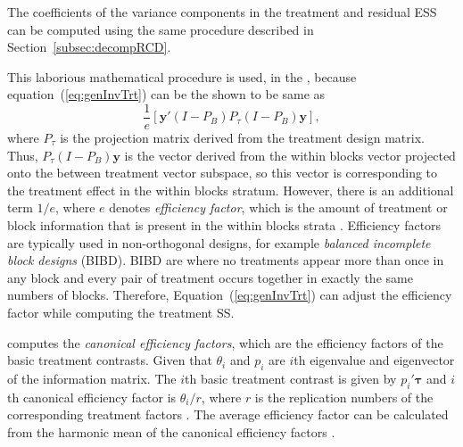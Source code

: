 \documentclass[article]{jss}
\begin{document}
The coefficients of the variance components in the treatment and residual ESS can be computed using the same procedure described in Section~\ref{subsec:decompRCD}.

This laborious mathematical procedure is used, in the , because equation~(\ref{eq:genInvTrt}) can be the shown to be same as 
\begin{equation}\label{eq:projTrtBlock}
\frac{1}{e}[ \bm{y}'(I - P_B)P_{\tau}(I - P_B)\bm{y}],
\end{equation}
where $P_{\tau}$ is the projection matrix derived from the treatment design matrix. Thus, $P_{\tau}(I - P_B)\bm{y}$ is the vector derived from the within blocks vector projected onto the between treatment vector subspace, so this vector is corresponding to the treatment effect in the within blocks stratum. However, there is an additional term $1/e$, where $e$ denotes \emph{efficiency factor}, which is the amount of treatment or block information that is present in the within blocks strata \citep{Yates1936}. Efficiency factors are typically used in non-orthogonal designs, for example \emph{balanced incomplete block designs} (BIBD). BIBD are where no treatments appear more than once in any block and every pair of treatment occurs together in exactly the same numbers of blocks. Therefore, Equation~(\ref{eq:genInvTrt}) can adjust the efficiency factor while computing the treatment SS.


 computes the \emph{canonical efficiency factors}, which are the efficiency factors of the basic treatment contrasts. Given that $\theta_i$ and $p_i$ are $i$th eigenvalue and eigenvector of the information matrix. The $i$th basic treatment contrast is given by $p_i'\bm{\tau}$ and $i$th canonical efficiency factor is $\theta_i/r$, where $r$ is the replication numbers of the corresponding treatment factors \citep{John1987}. The average efficiency factor can be calculated from the harmonic mean of the canonical efficiency factors \citep{John1987}.
\end{document}
